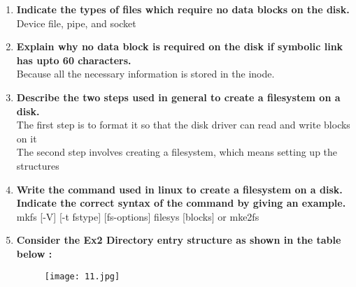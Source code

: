 \documentclass[a4paper,12pt]{article}
\begin{document}
\begin{flushleft}
\begin{enumerate}
{ext2\_dir\_entry\_2.
}\\
c)Character device (Type 3)\\
{\color{red}ascki devices such as keyboard and display}\\
 d)Block device (Type 4)
\\{\color{red}Hard disks}\\
e)Named pipe (Type 5)\\
{\color{red}FIFO files multiple processes open it to communicate with each other}\\
 f)Socket (Type 6)
\\{\color{red}file that lets processes share data via network}\\
g)Symbolic link (Type 7)
\\{\color{red}) Symbolic link
 If the pathname of a symbolic link has up to 60 characters,
it is stored in the i\_block field of the inode, which consists
of an array of 15 4-byte integers; no data block is therefore
required}\\
\item \textbf{ Indicate the types of files which require no data blocks on the disk.}\\
{\color{red}Device file, pipe, and socket }\\
\item \textbf{ Explain why no data block is required on the disk if symbolic link has upto 60 characters.}\\
{\color{red}Because all the necessary information is stored in the inode. }\\
\item \textbf{ Describe the two steps used in general to create a filesystem on a disk.}\\
{\color{red}The first step is to format it so that the disk driver can read and write blocks on it\\The second step involves creating a filesystem, which means setting up the structures}\\
\item \textbf{ Write the command used in linux to create a filesystem on a disk. Indicate the correct syntax of the command by giving an example.}\\
{\color{red}mkfs [-V] [-t fstype] [fs-options] filesys [blocks] or mke2fs}
\item \textbf{ Consider the Ex2 Directory entry structure as shown in the table below :}\\
\begin{figure}[H]
 \centering
  \texttt{[image: 11.jpg]}

\end{figure}
\end{enumerate}
\end{flushleft}
\end{document}
